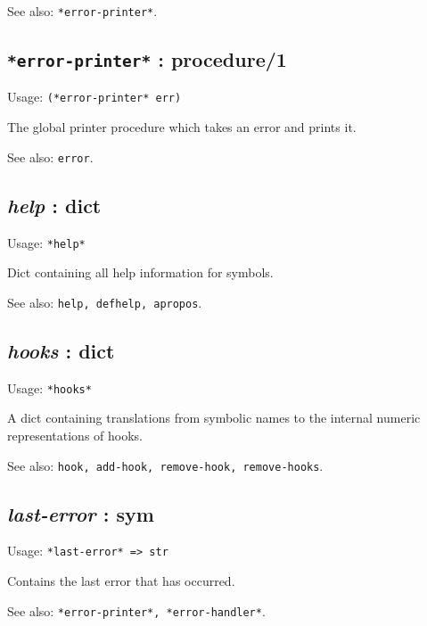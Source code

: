 \documentclass[
]{article}
\newcommand{\passthrough}[1]{#1}
\begin{document}
See also: \passthrough{\lstinline!*error-printer*!}.

\hypertarget{error-printer-procedure1-1}{%
\subsection{\texorpdfstring{\texttt{*error-printer*} :
procedure/1}{*error-printer* : procedure/1}}\label{error-printer-procedure1-1}}

Usage: \passthrough{\lstinline!(*error-printer* err)!}

The global printer procedure which takes an error and prints it.

See also: \passthrough{\lstinline!error!}.

\hypertarget{help-dict-1}{%
\subsection{\texorpdfstring{\emph{help} :
dict}{help : dict}}\label{help-dict-1}}

Usage: \passthrough{\lstinline!*help*!}

Dict containing all help information for symbols.

See also: \passthrough{\lstinline!help, defhelp, apropos!}.

\hypertarget{hooks-dict}{%
\subsection{\texorpdfstring{\emph{hooks} :
dict}{hooks : dict}}\label{hooks-dict}}

Usage: \passthrough{\lstinline!*hooks*!}

A dict containing translations from symbolic names to the internal
numeric representations of hooks.

See also:
\passthrough{\lstinline!hook, add-hook, remove-hook, remove-hooks!}.

\hypertarget{last-error-sym-1}{%
\subsection{\texorpdfstring{\emph{last-error} :
sym}{last-error : sym}}\label{last-error-sym-1}}

Usage: \passthrough{\lstinline!*last-error* => str!}

Contains the last error that has occurred.

See also: \passthrough{\lstinline!*error-printer*, *error-handler*!}.
\end{document}
